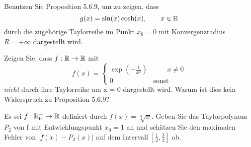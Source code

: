 \begin{Problem}
\begin{parts}
	\item Benutzen Sie Proposition 5.6.9, um zu zeigen, dass
		\[
		g(x)=\sin(x)\cosh(x), \qquad x\in \mathbb{R}
		\] 
durch die zugehörige Taylorreihe im Punkt $x_0 = 0$ mit Konvergenzradius $R=+\infty$ dargestellt wird.
\item Zeigen Sie, dass $f:\mathbb{R}\to \mathbb{R}$ mit
	\[
	f(x)=\begin{cases}
		\exp\left( -\frac{1}{x^2} \right) & \qquad x \neq 0\\
		0 & \text{sonst}
	\end{cases}
	\]
	\emph{nicht} durch ihre Taylorreihe um x = 0 dargestellt wird. Warum ist dies kein Widerspruch zu Proposition 5.6.9?
\end{parts}	
\end{Problem}

\begin{Problem}
	Es sei $f : \mathbb{R}_0^+ \to \mathbb{R}$ definiert durch $f (x) = \sqrt[3]{x}$. Geben Sie das Taylorpolynom $P_2$ von f mit Entwicklungspunkt $x_0 = 1$ an und schätzen Sie den maximalen Fehler von $|f(x) - P_2(x)|$ auf dem Intervall $\left[ \frac{1}{2},\frac{3}{2} \right] $ ab.
\end{Problem}

